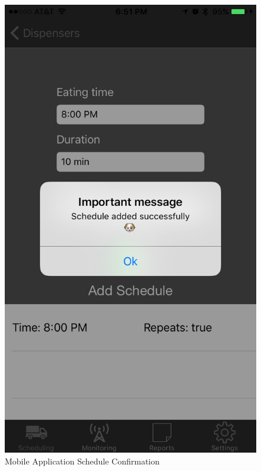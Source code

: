 \documentclass[12pt]{article}
\begin{document}
\begin{appendix}
  \begin{figure}[!htb]
    \begin{center}
        \includegraphics[scale=0.15]{Figures/iOSApp3.png}
    \end{center}
    \caption{Mobile Application Schedule Confirmation}
    \label{fig:iOSApp3}
  \end{figure}


\end{appendix}
\end{document}
